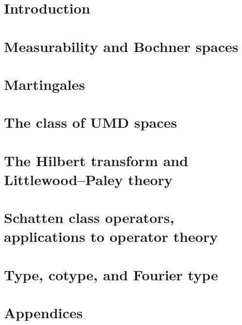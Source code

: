 \documentclass[a4paper,10pt,intlimits,sumlimits]{amsart}
\begin{document}


\maketitle
\footnotesize
\tableofcontents
\normalsize

\section{Introduction}
\label{sec:intro}


\section{Measurability and Bochner spaces}
\label{sec:Bochner-spaces}


\section{Martingales}
\label{sec:martingales} 


\section{The class of UMD spaces}
\label{sec:UMD}


\section{The Hilbert transform and Littlewood--Paley theory}
\label{sec:HT}


\section{Schatten class operators, applications to operator theory}
\label{sec:schatten}


\section{Type, cotype, and Fourier type}
\label{sec:type}


\section{Appendices}
\label{sec:appendices}





\printbibliography

% 
%  
\end{document}
